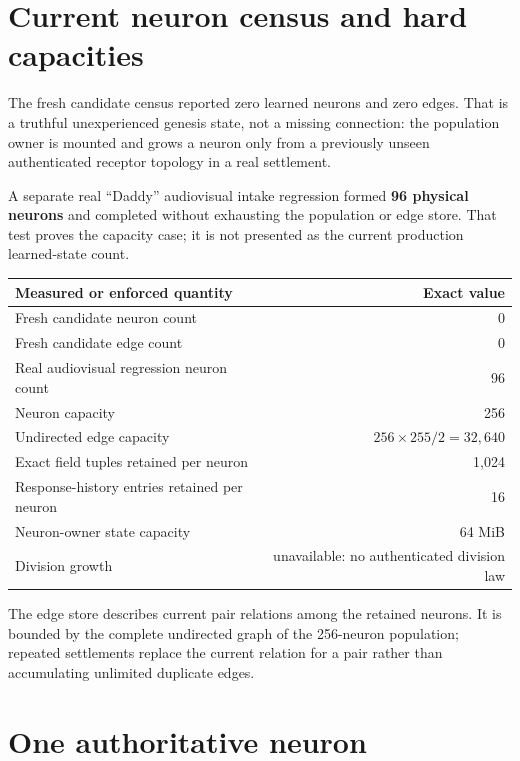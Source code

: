 \documentclass[11pt]{article}
\begin{document}
\section{Current neuron census and hard capacities}

The fresh candidate census reported zero learned neurons and zero edges.  That
is a truthful unexperienced genesis state, not a missing connection: the
population owner is mounted and grows a neuron only from a previously unseen
authenticated receptor topology in a real settlement.

A separate real ``Daddy'' audiovisual intake regression formed
\textbf{96 physical neurons} and completed without exhausting the population
or edge store.  That test proves the capacity case; it is not presented as the
current production learned-state count.

\begin{table}[h]
\centering
\begin{tabular}{lr}
\toprule
\textbf{Measured or enforced quantity} & \textbf{Exact value}\\
\midrule
Fresh candidate neuron count & 0\\
Fresh candidate edge count & 0\\
Real audiovisual regression neuron count & 96\\
Neuron capacity & 256\\
Undirected edge capacity & \(256\times255/2=32{,}640\)\\
Exact field tuples retained per neuron & 1,024\\
Response-history entries retained per neuron & 16\\
Neuron-owner state capacity & 64 MiB\\
Division growth & unavailable: no authenticated division law\\
\bottomrule
\end{tabular}
\end{table}

The edge store describes current pair relations among the retained neurons.
It is bounded by the complete undirected graph of the 256-neuron population;
repeated settlements replace the current relation for a pair rather than
accumulating unlimited duplicate edges.

\section{One authoritative neuron}
\end{document}
